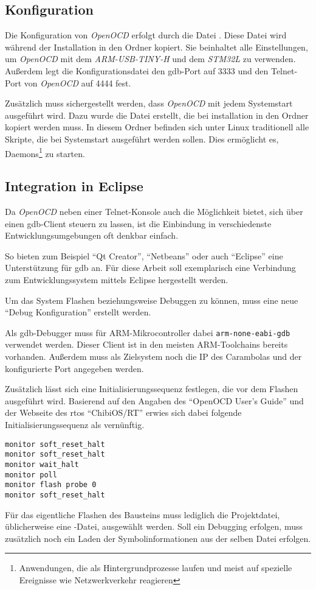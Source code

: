 \subsection{Konfiguration}
Die Konfiguration von \emph{OpenOCD} erfolgt durch die Datei .
Diese Datei wird während der Installation in den Ordner
 kopiert. Sie beinhaltet alle Einstellungen, um \emph{OpenOCD}
mit dem \emph{ARM-USB-TINY-H} und dem \emph{STM32L} zu verwenden. Außerdem legt die
Konfigurationsdatei den \gls{gdb}-Port auf 3333 und den Telnet-Port von \emph{OpenOCD}
auf 4444 fest.

Zusätzlich muss sichergestellt werden, dass \emph{OpenOCD} mit jedem Systemstart
ausgeführt wird. Dazu wurde die Datei  erstellt, die
bei installation in den Ordner  kopiert werden muss. In
diesem Ordner befinden sich unter Linux traditionell alle Skripte, die bei
Systemstart ausgeführt werden sollen. Dies ermöglicht es,
Daemons\footnote{Anwendungen, die als Hintergrundprozesse laufen und meist auf
spezielle Ereignisse wie Netzwerkverkehr reagieren} zu starten.
\subsection{Integration in Eclipse}\label{subs:eclipse}
Da \emph{OpenOCD} neben einer Telnet-Konsole auch die Möglichkeit bietet, sich über
einen \gls{gdb}-Client steuern zu lassen, ist die Einbindung in verschiedenste
Entwicklungsumgebungen oft denkbar einfach.

So bieten zum Beispiel "`Qt Creator"', "`Netbeans"' oder auch "`Eclipse"' eine
Unterstützung für \gls{gdb} an. Für diese Arbeit soll exemplarisch eine
Verbindung zum Entwicklungssystem mittels Eclipse hergestellt werden.

Um das System Flashen beziehungsweise Debuggen zu können, muss eine neue "`Debug
Konfiguration"' erstellt werden.

Als \gls{gdb}-Debugger muss für ARM-Mikrocontroller dabei
\texttt{arm-none-eabi-gdb} verwendet werden. Dieser Client ist in den meisten
ARM-Toolchains bereits vorhanden. Außerdem muss als Zielsystem noch die IP des
Carambolas und der konfigurierte Port angegeben werden.

Zusätzlich lässt sich eine Initialisierungssequenz festlegen, die vor dem
Flashen ausgeführt wird. Basierend auf den Angaben des "`OpenOCD User's
Guide"'\cite{OOCD} und der Webseite des \gls{rtos} "`ChibiOS/RT"'\cite{CHIB}
erwies sich dabei folgende Initialisierungssequenz als vernünftig.
\begin{lstlisting}
monitor soft_reset_halt
monitor soft_reset_halt
monitor wait_halt
monitor poll
monitor flash probe 0
monitor soft_reset_halt
\end{lstlisting}
Für das eigentliche Flashen des Bausteins muss lediglich die Projektdatei,
üblicherweise eine -Datei, ausgewählt werden. Soll ein
Debugging erfolgen, muss zusätzlich noch ein Laden der Symbolinformationen aus
der selben Datei erfolgen.
